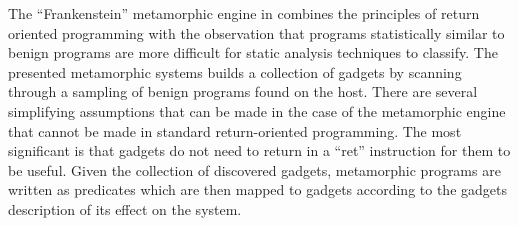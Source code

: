     The ``Frankenstein'' metamorphic engine in \cite{franken} combines the
    principles of return oriented programming with the observation that programs
    statistically similar to benign programs are more difficult for static
    analysis techniques to classify. The presented metamorphic systems builds a
    collection of gadgets by scanning through a sampling of benign programs
    found on the host. There are several simplifying assumptions that can be
    made in the case of the metamorphic engine that cannot be made in standard
    return-oriented programming. The most significant is that gadgets do not
    need to return in a ``ret'' instruction for them to be useful. Given the
    collection of discovered gadgets, metamorphic programs are written as
    predicates which are then mapped to gadgets according to the gadgets
    description of its effect on the system.

